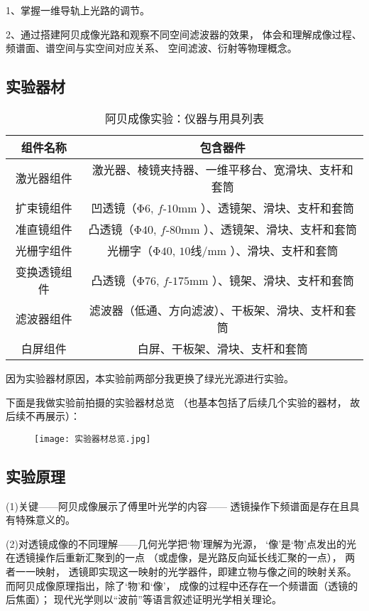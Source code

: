 \documentclass[11pt]{article}
\begin{document}
1、掌握一维导轨上光路的调节。

2、通过搭建阿贝成像光路和观察不同空间滤波器的效果，
体会和理解成像过程、频谱面、谱空间与实空间对应关系、
空间滤波、衍射等物理概念。

\subsection{实验器材}

\begin{table}[htbp]
    \centering
    \begin{tabular}{cc}
        \toprule
        组件名称 & 包含器件\\ \midrule
        激光器组件& 激光器、棱镜夹持器、一维平移台、宽滑块、支杆和套筒\\
        扩束镜组件& 凹透镜（Φ$ 6$, $f$-$10$mm ）、透镜架、滑块、支杆和套筒\\ 
        准直镜组件& 凸透镜（Φ$40$, $f$-$80$mm ）、透镜架、滑块、支杆和套筒\\ 
        光栅字组件& 光栅字（Φ$40$, $10$线/mm ）、滑块、支杆和套筒\\ 
        变换透镜组件& 凸透镜（Φ$76$, $f$-$175$mm ）、镜架、滑块、支杆和套筒\\ 
        滤波器组件& 滤波器（低通、方向滤波）、干板架、滑块、支杆和套筒\\ 
        白屏组件& 白屏、干板架、滑块、支杆和套筒\\ \bottomrule
    \end{tabular}
    \caption{阿贝成像实验：仪器与用具列表}
\end{table}

因为实验器材原因，本实验前两部分我更换了绿光光源进行实验。

下面是我做实验前拍摄的实验器材总览
（也基本包括了后续几个实验的器材，
故后续不再展示）：
\begin{figure}[H]
    \centering
    \texttt{[image: 实验器材总览.jpg]}
\end{figure}



\subsection{实验原理}

(1)关键——阿贝成像展示了傅里叶光学的内容——
透镜操作下频谱面是存在且具有特殊意义的。



(2)对透镜成像的不同理解——几何光学把‘物’理解为光源，
‘像’是‘物’点发出的光在透镜操作后重新汇聚到的一点
（或虚像，是光路反向延长线汇聚的一点），
两者一一映射，
透镜即实现这一映射的光学器件，即建立物与像之间的映射关系。
而阿贝成像原理指出，除了‘物’和‘像’，
成像的过程中还存在一个频谱面（透镜的后焦面）；
现代光学则以“波前”等语言叙述证明光学相关理论。
\end{document}
